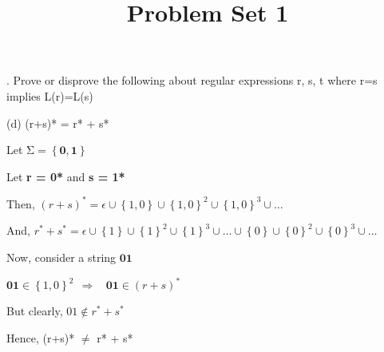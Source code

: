 \documentclass{article}
\begin{document}
\title{Problem Set 1}
\maketitle


. Prove or disprove the following about regular expressions r, s, t where r=s implies L(r)=L(s)

\noindent     (d) (r+s)* = r* + s*

\noindent 

Let $\boldsymbol{\mathrm{\Sigma }}\boldsymbol{=}\left\{\boldsymbol{0},\boldsymbol{1}\right\}$

Let \textbf{r = 0*} and \textbf{s = 1*}

 Then, ${\left(r+s\right)}^*=\epsilon \cup \left\{1,0\right\}\cup {\left\{1,0\right\}}^2\cup {\left\{1,0\right\}}^3\cup \dots $

 And, $r^*+s^*=\epsilon \cup \left\{1\right\}\cup {\left\{1\right\}}^2\cup {\left\{1\right\}}^3\cup \dots \cup \left\{0\right\}\cup {\left\{0\right\}}^2\cup {\left\{0\right\}}^3\cup \dots $

Now, consider a string $\boldsymbol{01}$

$\boldsymbol{01}\in {\left\{1,0\right\}}^2\ \ \Rightarrow \ \ \ \ \boldsymbol{01}\in {\left(r+s\right)}^*$

 But clearly,    $01\notin r^*+s^*$

Hence, (r+s)* $\neq $ r* + s*

\noindent 
\end{document}
